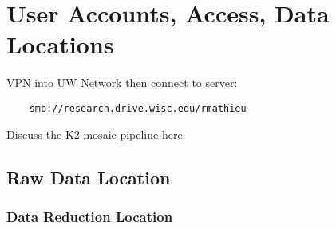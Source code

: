 
\chapter*{User Accounts, Access, Data Locations}

VPN into UW Network then connect to server:
\begin{verbatim}
    smb://research.drive.wisc.edu/rmathieu
\end{verbatim}

Discuss the K2 mosaic pipeline here


\section*{Raw Data Location}


\subsection*{Data Reduction Location}

